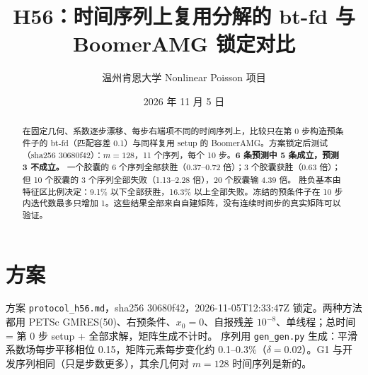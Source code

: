 \documentclass[11pt,a4paper]{ctexart}
\title{H56：时间序列上复用分解的 bt-fd 与 BoomerAMG 锁定对比}
\author{温州肯恩大学 \quad Nonlinear Poisson 项目}
\date{2026 年 11 月 5 日}
\begin{document}
\maketitle
\begin{center}\end{center}
\sloppy

\begin{abstract}
在固定几何、系数逐步漂移、每步右端项不同的时间序列上，比较只在第 0 步构造预条件子的 bt-fd（匹配容差 0.1）与同样复用 setup 的 BoomerAMG。方案锁定后测试（sha256 30680f42）：$m=128$，11 个序列，每个 10 步。\textbf{6 条预测中 5 条成立，预测 3 不成立。}
一个胶囊的 6 个序列全部获胜（0.37--0.72 倍）；3 个胶囊获胜（0.63 倍）；但 10 个胶囊的 3 个序列全部失败（1.13--2.28 倍），20 个胶囊输 4.39 倍。
胜负基本由特征区比例决定：9.1\% 以下全部获胜，16.3\% 以上全部失败。冻结的预条件子在 10 步内迭代数最多只增加 1。这些结果全部来自自建矩阵，没有连续时间步的真实矩阵可以验证。
\end{abstract}

\section{方案}
方案 \texttt{protocol\_h56.md}，sha256 30680f42，2026-11-05T12:33:47Z 锁定。两种方法都用 PETSc GMRES(50)、右预条件、$x_0=0$、自报残差 $10^{-8}$、单线程；总时间 = 第 0 步 setup + 全部求解，矩阵生成不计时。
序列用 \texttt{gen\_gen.py} 生成：平滑系数场每步平移相位 0.15，矩阵元素每步变化约 0.1--0.3\%（$\delta=0.02$）。G1 与开发序列相同（只是步数更多），其余几何对 $m=128$ 时间序列是新的。
\end{document}
